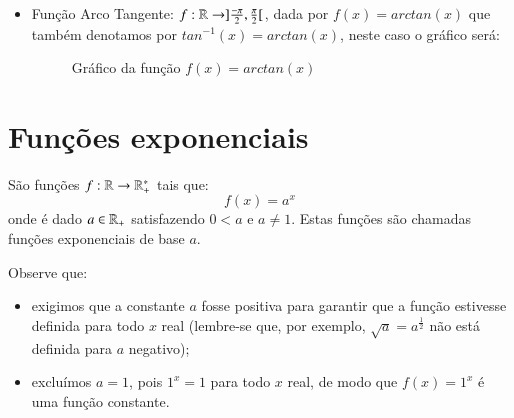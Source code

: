 \begin{itemize}
  
  \item Função Arco Tangente: $f: \mathbb{R} \rightarrow ]\frac{-\pi}{2}, \frac{\pi}{2}[$, dada por $f(x)= arctan(x)$ que também denotamos por $tan^{-1}(x)= arctan (x)$, neste caso o gráfico será:

  \begin{figure}[H]
  \centering
    \caption{Gráfico da função $f(x)= arctan(x)$}
  \end{figure}
  

  \end{itemize}

  
  \newpage
 \section{Funções exponenciais}

  \colorbox{azul}{
 \begin{minipage}{0.9\linewidth}
 \begin{center}
 São funções $f: \mathbb{R} \rightarrow \mathbb{R}_{+}^{*} $ tais que:
 \[f(x) = a^x\]
 onde é dado $a \in \mathbb{R}_{+}$ satisfazendo $0 < a$ e $a \neq 1$. Estas funções são chamadas funções exponenciais de base $a$.
 \end{center}
 \end{minipage}}
 \vskip0.3cm
 
 Observe que:
 \begin{itemize}
  \item exigimos que a constante $a$ fosse positiva para garantir que a função estivesse definida para todo $x$ real (lembre-se que, por exemplo, $\sqrt{a}= a^{\frac{1}{2}}$ não está definida para $a$ negativo);
  \item excluímos $a=1$, pois $1^x=1$ para todo $x$ real, de modo que $f(x)= 1^x$ é uma função constante.
 \end{itemize}
 
